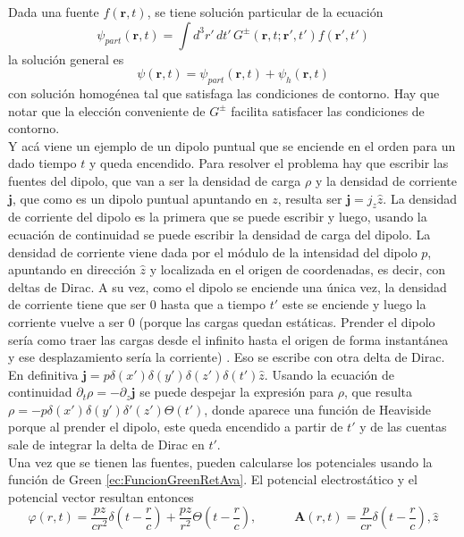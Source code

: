 \indent Dada una fuente $f(\textbf{r},t)$, se tiene solución particular de la ecuación
\begin{equation*}
    \psi_{part}(\textbf{r},t) = 
    \int d^{3}r'\,dt'\,G^{\pm}(\textbf{r},t; \textbf{r}',t')f(\textbf{r}',t')
\end{equation*}
la solución general es 
\begin{equation*}
    \psi(\textbf{r},t) = \psi_{part}(\textbf{r},t) + \psi_{h}(\textbf{r},t)
\end{equation*}
con solución homogénea tal que satisfaga las condiciones de contorno. Hay que notar que la elección conveniente de $G^{\pm}$ facilita satisfacer las condiciones de contorno. \\
\indent Y acá viene un ejemplo de un dipolo puntual que se enciende en el orden para un dado tiempo $t$ y queda encendido. Para resolver el problema hay que escribir las fuentes del dipolo, que van a ser la densidad de carga $\rho$ y la densidad de corriente $\textbf{j}$, que como es un dipolo puntual apuntando en $z$, resulta ser $\textbf{j} = j_{z} \hat{z}$. La densidad de corriente del dipolo es la primera que se puede escribir y luego, usando la ecuación de continuidad se puede escribir la densidad de carga del dipolo. La densidad de corriente viene dada por el módulo de la intensidad del dipolo $p$, apuntando en dirección $\hat{z}$ y localizada en el origen de coordenadas, es decir, con deltas de Dirac. A su vez, como el dipolo se enciende una única vez, la densidad de corriente tiene que ser 0 hasta que a tiempo $t'$ este se enciende y luego la corriente vuelve a ser 0 (porque las cargas quedan estáticas. Prender el dipolo sería como traer las cargas desde el infinito hasta el origen de forma instantánea y ese desplazamiento sería la corriente) . Eso se escribe con otra delta de Dirac. En definitiva $\textbf{j} = p \delta(x')\delta(y')\delta(z')\delta(t')\hat{z}$. Usando la ecuación de continuidad $\partial_{t}\rho = - \partial_{z}\textbf{j}$ se puede despejar la expresión para $\rho$, que resulta $\rho = -p \delta(x')\delta(y')\delta'(z')\Theta(t')$, donde aparece una función de Heaviside porque al prender el dipolo, este queda encendido a partir de $t'$ y de las cuentas sale de integrar la delta de Dirac en $t'$.\\
\indent Una vez que se tienen las fuentes, pueden calcularse los potenciales usando la función de Green \eqref{ec:FuncionGreenRetAva}. El potencial electrostático y el potencial vector resultan entonces
\begin{equation*}
    \varphi(r,t) = \frac{pz}{cr^{2}}\delta
    \left(
        t - \frac{r}{c}
    \right)
    +
    \frac{pz}{r^{2}}\Theta
    \left(
        t - \frac{r}{c}
    \right),
    \quad\quad\quad
    \textbf{A}(r,t) = \frac{p}{cr}\delta
    \left(
        t - \frac{r}{c}
    \right),
    \hat{z}
\end{equation*}
